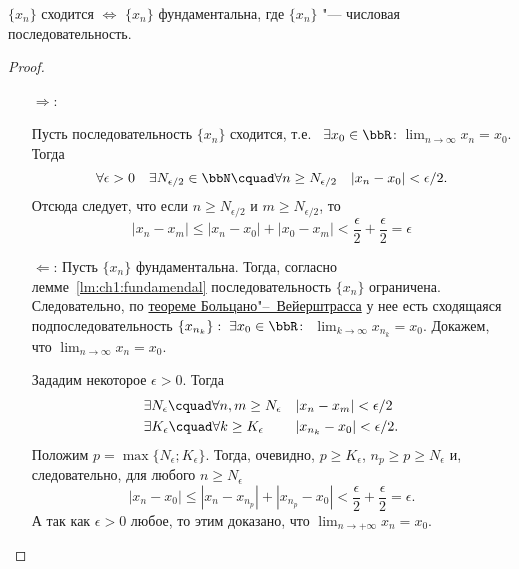 \begin{thm} 
$\{x_n\}$ сходится $\Longleftrightarrow$ $\{x_n\}$ фундаментальна, где $\{x_n\}$ "--- числовая последовательность.
\end{thm}
\begin{proof}\leavevmode
\begin{itemize}[wide, labelwidth=!, labelindent=0pt]
\item[$\Longrightarrow$:]

Пусть последовательность $\{x_n\}$ сходится, т.е.~ $\exists x_{0} \in \bbR$:  $\lim_{n \to \infty}\limits x_n = x_0$. Тогда 
$$
\forall \epsilon > 0\quad \exists N_{\epsilon/2} \in \bbN\cquad \forall n \ge N_{\epsilon/2}\quad |x_n-x_0|<\epsilon/2.
$$
Отсюда следует, что если $n \ge N_{\epsilon/2}$ и $m \ge N_{\epsilon/2}$, то
$$
|x_n-x_m| \le |x_n-x_0|+|x_0-x_m| <\frac{\epsilon}{2}+\frac{\epsilon}{2}=\epsilon
$$

\item[$\Longleftarrow$:]
Пусть $\{x_n\}$ фундаментальна. Тогда, согласно лемме~\ref{lm:ch1:fundamendal} последовательность $\{x_n\}$ ограничена. Следовательно, по \hyperref[th:ch1:TBV]{теореме Больцано"--~Вейерштрасса} у нее есть сходящаяся подпоследовательность $\{x_{n_k}\}: \;\exists x_0 \in \bbR\colon$ $\lim_{k \to \infty}\limits x_{n_k} =x_0 $. Докажем, что $\lim_{n \to \infty}\limits x_{n}=x_0 $.

Зададим некоторое $\epsilon > 0$. Тогда
\begin{gather*}
\begin{aligned}
& \exists N_\epsilon\cquad \forall n,m \ge N_\epsilon &&|x_n-x_m|<\epsilon/2\\
& \exists K_\epsilon\cquad \forall k \ge K_\epsilon   &&|x_{n_k}-x_0|<\epsilon/2.
\end{aligned}
\end{gather*}
Положим $p=\max\{N_\epsilon;K_\epsilon\}$. Тогда, очевидно, $p \ge K_\epsilon$, $n_p \ge p \ge N_\epsilon$ и, следовательно, для любого $n \ge N_\epsilon$
$$
|x_n-x_0| \le |x_n-x_{n_p}|+|x_{n_p}-x_0|<\frac{\epsilon}{2}+\frac{\epsilon}{2}=\epsilon.
$$
А так как $\epsilon > 0$ любое, то этим доказано, что $\lim_{n \to +\infty}\limits x_n = x_0$. \qedhere
\end{itemize}
\end{proof}
